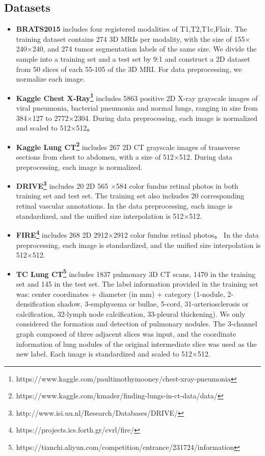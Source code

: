 \documentclass[runningheads]{llncs}
\begin{document}
\subsection{Datasets}
\begin{itemize}
\item \textbf{BRATS2015\cite{91menze:hal-00935640}} includes four registered modalities of T1,T2,T1c,Flair. The training dataset contains 274 3D MRIs per modality, with the size of 155$\times$240$\times$240, and 274 tumor segmentation labels of the same size. We divide the sample into a training set and a test set by 9:1 and construct a 2D dataset from 50 slices of each 55-105 of the 3D MRI. For data preprocessing, we normalize each image.
\item\textbf{Kaggle Chest X-Ray\footnote{https://www.kaggle.com/paultimothymooney/chest-xray-pneumonia }} includes 5863 positive 2D X-ray grayscale images of viral pneumonia, bacterial pneumonia and normal lungs, ranging in size from 384$\times$127 to 2772$\times$2304. During data preprocessing, each image is normalized and scaled to 512$\times$512。
\item\textbf{Kaggle Lung CT\footnote{https://www.kaggle.com/kmader/finding-lungs-in-ct-data/data/}} includes 267 2D CT grayscale images of transverse sections from chest to abdomen, with a size of 512$\times$512. During data preprocessing, each image is normalized.
\item\textbf{DRIVE\footnote{http://www.isi.uu.nl/Research/Databases/DRIVE/}} includes 20 2D   565 $\times $584 color fundus retinal photos in both training set and test set. The training set also inchudes 20 corresponding retinal vascular annotations. In the data preprocessing, each image is standardized, and the unified size interpolation is 512$\times$512.
\item\textbf{FIRE\footnote{https://projects.ics.forth.gr/cvrl/fire/}} includes 268  2D   2912$\times$2912 color fundus retinal photos。 In the data preprocessing, each image is standardized, and the unified size interpolation is 512$\times$512.
\item\textbf{TC Lung CT\footnote{https://tianchi.aliyun.com/competition/entrance/231724/information}} includes 1837 pulmonary 3D CT scans, 1470 in the training set and 145 in the test set. The label information provided in the training set was: center coordinates + diameter (in mm) + category (1-nodule, 2-densification shadow, 3-emphysema or bullae, 5-cord, 31-arteriosclerosis or calcification, 32-lymph node calcification, 33-pleural thickening). We only considered the formation and detection of pulmonary nodules. The 3-channel graph composed of three adjacent slices was input, and the coordinate information of lung nodules of the original intermediate slice was used as the new label. Each image is standardized and scaled to 512$\times$512.
\end{itemize}
\end{document}
